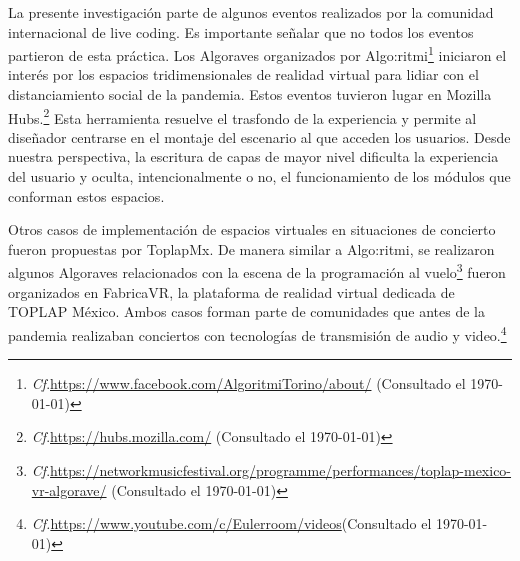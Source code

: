 



La presente investigación parte de algunos eventos realizados por la comunidad internacional de live coding. Es importante señalar que no todos los eventos partieron de esta práctica. Los Algoraves organizados por Algo:ritmi\footnote{\emph{Cf}.\url{https://www.facebook.com/AlgoritmiTorino/about/} (Consultado el \today)} iniciaron el interés por los espacios tridimensionales de realidad virtual para lidiar con el distanciamiento social de la pandemia. Estos eventos tuvieron lugar en Mozilla Hubs.\footnote{\emph{Cf}.\url{https://hubs.mozilla.com/} (Consultado el \today)} Esta herramienta resuelve el trasfondo de la experiencia y permite al diseñador centrarse en el montaje del escenario al que acceden los usuarios. Desde nuestra perspectiva, la escritura de capas de mayor nivel dificulta la experiencia del usuario y oculta, intencionalmente o no, el funcionamiento de los módulos que conforman estos espacios. 

Otros casos de implementación de espacios virtuales en situaciones de concierto fueron propuestas por ToplapMx. De manera similar a Algo:ritmi, se realizaron algunos Algoraves relacionados con la escena de la programación al vuelo\footnote{\emph{Cf}.\url{https://networkmusicfestival.org/programme/performances/toplap-mexico-vr-algorave/} (Consultado el \today)} fueron organizados en FabricaVR, la plataforma de realidad virtual dedicada de TOPLAP México. Ambos casos forman parte de comunidades que antes de la pandemia realizaban conciertos con tecnologías de transmisión de audio y video.\footnote{\emph{Cf.}\url{https://www.youtube.com/c/Eulerroom/videos}(Consultado el \today)}%

